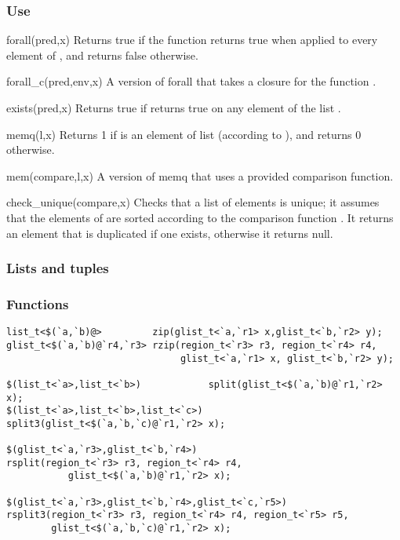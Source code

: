 \subsubsection*{Use}

\begin{defun}{forall}{(pred,x)}
Returns true if the function  returns true when applied to
every element of , and returns false otherwise.
\end{defun}

\begin{defun}{forall_c}{(pred,env,x)}
A version of forall that takes a closure for the function .
\end{defun}

\begin{defun}{exists}{(pred,x)}
Returns true if  returns true on any element of the list
.
\end{defun}

\begin{defun}{memq}{(l,x)}
Returns 1 if  is an element of list  (according to
\code{==}), and returns 0 otherwise.
\end{defun}

\begin{defun}{mem}{(compare,l,x)}
A version of memq that uses a provided comparison function.
\end{defun}

\begin{defun}{check_unique}{(compare,x)}
Checks that a list of elements is unique; it assumes that the elements
of  are sorted according to the comparison function
.  It returns an element that is duplicated if one exists,
otherwise it returns null.
\end{defun}

\subsubsection*{Lists and tuples}
\subsubsection*{Functions}
\begin{verbatim}
list_t<$(`a,`b)@>         zip(glist_t<`a,`r1> x,glist_t<`b,`r2> y);
glist_t<$(`a,`b)@`r4,`r3> rzip(region_t<`r3> r3, region_t<`r4> r4,
                               glist_t<`a,`r1> x, glist_t<`b,`r2> y);

$(list_t<`a>,list_t<`b>)            split(glist_t<$(`a,`b)@`r1,`r2> x);
$(list_t<`a>,list_t<`b>,list_t<`c>) split3(glist_t<$(`a,`b,`c)@`r1,`r2> x);

$(glist_t<`a,`r3>,glist_t<`b,`r4>)
rsplit(region_t<`r3> r3, region_t<`r4> r4,
           glist_t<$(`a,`b)@`r1,`r2> x);

$(glist_t<`a,`r3>,glist_t<`b,`r4>,glist_t<`c,`r5>)
rsplit3(region_t<`r3> r3, region_t<`r4> r4, region_t<`r5> r5,
        glist_t<$(`a,`b,`c)@`r1,`r2> x);
\end{verbatim}

